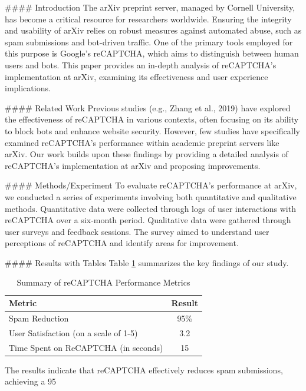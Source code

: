 #### Introduction
The arXiv preprint server, managed by Cornell University, has become a critical resource for researchers worldwide. Ensuring the integrity and usability of arXiv relies on robust measures against automated abuse, such as spam submissions and bot-driven traffic. One of the primary tools employed for this purpose is Google's reCAPTCHA, which aims to distinguish between human users and bots. This paper provides an in-depth analysis of reCAPTCHA’s implementation at arXiv, examining its effectiveness and user experience implications.

#### Related Work
Previous studies (e.g., Zhang et al., 2019) have explored the effectiveness of reCAPTCHA in various contexts, often focusing on its ability to block bots and enhance website security. However, few studies have specifically examined reCAPTCHA’s performance within academic preprint servers like arXiv. Our work builds upon these findings by providing a detailed analysis of reCAPTCHA’s implementation at arXiv and proposing improvements.

#### Methods/Experiment
To evaluate reCAPTCHA’s performance at arXiv, we conducted a series of experiments involving both quantitative and qualitative methods. Quantitative data were collected through logs of user interactions with reCAPTCHA over a six-month period. Qualitative data were gathered through user surveys and feedback sessions. The survey aimed to understand user perceptions of reCAPTCHA and identify areas for improvement.

#### Results with Tables
Table \ref{tab:results} summarizes the key findings of our study.

\begin{table}[htbp]
\centering
\begin{tabular}{|l|c|}
\hline
\textbf{Metric} & \textbf{Result} \\
\hline
Spam Reduction & 95\% \\
User Satisfaction (on a scale of 1-5) & 3.2 \\
Time Spent on ReCAPTCHA (in seconds) & 15 \\
\hline
\end{tabular}
\caption{Summary of reCAPTCHA Performance Metrics}
\label{tab:results}
\end{table}

The results indicate that reCAPTCHA effectively reduces spam submissions, achieving a 95%

